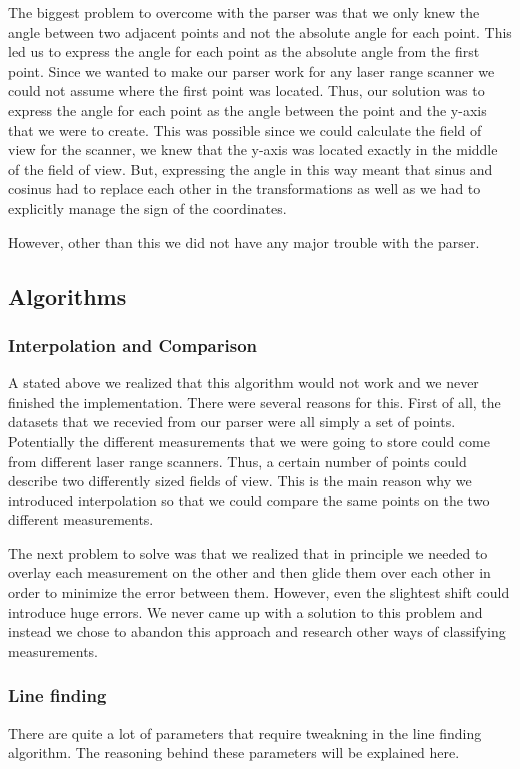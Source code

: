 \documentclass[a4paper, 10pt, conference]{ieeeconf}      %
\begin{document}
The biggest problem to overcome with the parser was that we only knew the angle between two adjacent points and not the absolute angle for each point. This led us to express the angle for each point as the absolute angle from the first point. Since we wanted to make our parser work for any laser range scanner we could not assume where the first point was located. Thus, our solution was to express the angle for each point as the angle between the point and the y-axis that we were to create. This was possible since we could calculate the field of view for the scanner, we knew that the y-axis was located exactly in the middle of the field of view. But, expressing the angle in this way meant that sinus and cosinus had to replace each other in the transformations as well as we had to explicitly manage the sign of the coordinates.

However, other than this we did not have any major trouble with the parser.

\subsection{Algorithms}

\subsubsection{Interpolation and Comparison}
A stated above we realized that this algorithm would not work and we never finished the implementation. There were several reasons for this. First of all, the datasets that we recevied from our parser were all simply a set of points. Potentially the different measurements that we were going to store could come from different laser range scanners. Thus, a certain number of points could describe two differently sized fields of view. This is the main reason why we introduced interpolation so that we could compare the same points on the two different measurements.

The next problem to solve was that we realized that in principle we needed to overlay each measurement on the other and then glide them over each other in order to minimize the error between them. However, even the slightest shift could introduce huge errors. We never came up with a solution to this problem and instead we chose to abandon this approach and research other ways of classifying measurements.

\subsubsection{Line finding}
There are quite a lot of parameters that require tweakning in the line finding algorithm. The reasoning behind these parameters will be explained here.
\end{document}
